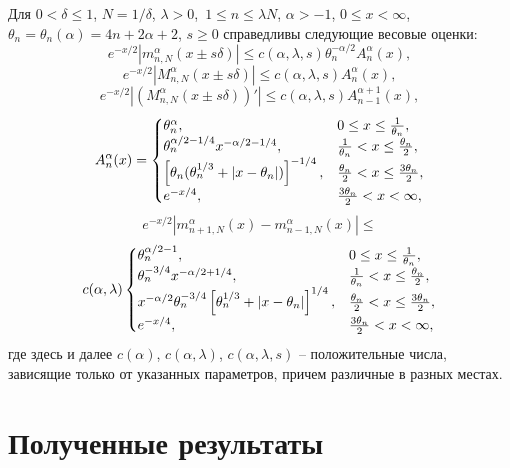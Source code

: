 Для $0<\delta\le1$, $N={1/\delta}$, $\lambda>0$,\ $1\le n\le\lambda N$, $\alpha>-1$, $0\le x<\infty$, $\theta_n=\theta_n(\alpha)=4n+2\alpha+2$, $s\geq0$ справедливы
\cite{RamSharMnog} следующие весовые оценки:
\begin{equation*}
e^{-x/2}\left|m_{n,N}^\alpha(x\pm s\delta)\right|\le c(\alpha,\lambda,s)\theta_n^{-\alpha/2}A_n^\alpha(x),
\end{equation*}
\begin{equation*}
e^{-x/2}\left|M_{n,N}^\alpha(x\pm s\delta)\right|\le c(\alpha,\lambda,s)A_n^\alpha(x),
\end{equation*}
\begin{equation*}
e^{-x/2}\left|(M_{n,N}^\alpha(x\pm s\delta))'\right|\le c(\alpha,\lambda,s)A_{n-1}^{\alpha+1}(x),
\end{equation*}
\begin{equation*}
A_n^\alpha(x)=\begin{cases}
\theta_n^{\alpha},&  0\le x\le \frac{1}{\theta_n},\\
\theta_n^{\alpha/2-1/4}x^{-\alpha/2-1/4},&     \frac{1}{\theta_n}<x\le {\theta_n\over 2},\\
\left[\theta_n(\theta_n^{1/3}+|x-\theta_n|)\right]^{-1/4},& {\theta_n\over2}<x\leq{3\theta_n\over2},\\
e^{-x/4}, & {3\theta_n\over2}<x<\infty,
\end{cases}
\end{equation*}
$$
e^{-x/2}\left|m_{n+1,N}^{\alpha}(x)-m_{n-1,N}^{\alpha}(x)\right|\leq
$$
\begin{equation*}
c(\alpha,\lambda)\begin{cases}
\theta_n^{\alpha/2-1},&  0\le x\le \frac{1}{\theta_n},\\
\theta_n^{-3/4}x^{-\alpha/2+1/4},&     \frac{1}{\theta_n}<x\le {\theta_n\over 2},\\
x^{-\alpha/2}\theta_n^{-3/4}\left[\theta_n^{1/3}+|x-\theta_n|\right]^{1/4},& {\theta_n\over2}<x\leq{3\theta_n\over2},\\
e^{-x/4}, & {3\theta_n\over2}<x<\infty,
\end{cases}
\end{equation*}
где здесь и далее $c(\alpha)$, $c(\alpha, \lambda)$, $c(\alpha, \lambda, s)$ -- положительные числа, зависящие только от указанных параметров, причем различные в разных местах.

\section{Полученные результаты}

